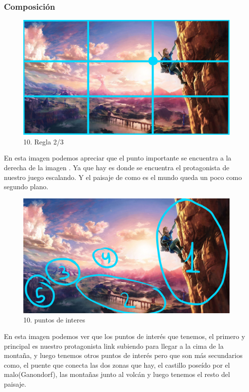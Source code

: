 \documentclass[12pt]{article}
\begin{document}
    \subsubsection{Composición}
    \begin{figure}[H]
      \centering
      \includegraphics[width=\textwidth]{images/Selena/10 3.3.jpg}
      \caption{\small 10. Regla 2/3}
    \end{figure}
    En esta imagen podemos apreciar que el punto importante se encuentra a la derecha de la imagen . Ya que hay es donde se encuentra el protagonista de nuestro juego escalando. Y el paisaje de como es el mundo queda un poco como segundo plano. 
    \begin{figure}[H]
      \centering
      \includegraphics[width=\textwidth]{images/Selena/10 puntos de interes.jpg}
      \caption{\small 10. puntos de interes}
    \end{figure}
    En esta imagen podemos ver que los puntos de interés que tenemos, el primero y principal es nuestro protagonista link subiendo para llegar a la cima de la montaña, y luego tenemos otros puntos de interés pero que son más secundarios como, el puente que conecta las dos zonas que hay, el castillo poseído por el malo(Ganondorf), las montañas junto al volcán y luego tenemos el resto del paisaje. 
\end{document}
